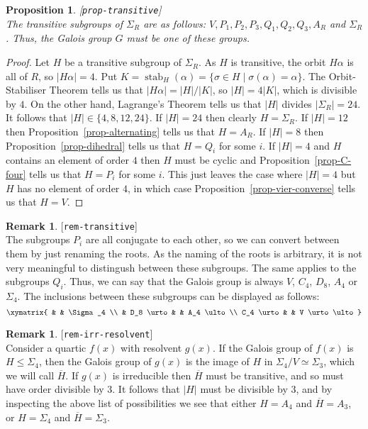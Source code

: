 \documentclass{amsart}
\newcommand{\lbl}[1]{\label{#1}\textup{[\texttt{#1}]}\ \\}
\newcommand{\lbl}{\label}
\newcommand{\stab}	{\operatorname{stab}}
\newcommand{\al}        {\alpha}
\newcommand{\sg}        {\sigma}
\newcommand{\Sg}        {\Sigma}
\newcommand{\ov}[1]     {\overline{#1}}
\newcommand{\st}        {\;|\;}
\renewcommand{\:}{\colon}
\newtheorem{proposition}[theorem]{Proposition}
\theoremstyle{definition}
\newtheorem{remark}[theorem]{Remark}
\begin{document}
\begin{proposition}\lbl{prop-transitive}
 The transitive subgroups of $\Sg_R$ are as follows:
 $V,P_1,P_2,P_3,Q_1,Q_2,Q_3,A_R$ and $\Sg_R$.  Thus, the Galois group
 $G$ must be one of these groups.
\end{proposition}
\begin{proof}
 Let $H$ be a transitive subgroup of $\Sg_R$.  
 As $H$ is transitive, the orbit $H\al$ is all of $R$, so $|H\al|=4$.
 Put $K=\stab_H(\al)=\{\sg\in H\st\sg(\al)=\al\}$.  The
 Orbit-Stabiliser Theorem tells us that $|H\al|=|H|/|K|$, so
 $|H|=4|K|$, which is divisible by $4$.  On the other hand, Lagrange's
 Theorem tells us that $|H|$ divides $|\Sg_R|=24$.  It follows that
 $|H|\in\{4,8,12,24\}$.  If $|H|=24$ then clearly $H=\Sg_R$.  If
 $|H|=12$ then Proposition~\ref{prop-alternating} tells us that
 $H=A_R$.  If $|H|=8$ then Proposition~\ref{prop-dihedral} tells us
 that $H=Q_i$ for some $i$.  If $|H|=4$ and $H$ contains an element of
 order $4$ then $H$ must be cyclic and Proposition~\ref{prop-C-four}
 tells us that $H=P_i$ for some $i$.  This just leaves the case where
 $|H|=4$ but $H$ has no element of order $4$, in which case
 Proposition~\ref{prop-vier-converse} tells us that $H=V$.
\end{proof}

\begin{remark}\lbl{rem-transitive}
 The subgroups $P_i$ are all conjugate to each other, so we can
 convert between them by just renaming the roots.  As the naming of
 the roots is arbitrary, it is not very meaningful to distingush
 between these subgroups.  The same applies to the subgroups $Q_i$.
 Thus, we can say that the Galois group is always $V$, $C_4$, $D_8$,
 $A_4$ or $\Sg_4$.  The inclusions between these subgroups can be
 displayed as follows:
 \[ \xymatrix{
     & & \Sg_4 \\
     & D_8 \urto & & A_4 \ulto \\
     C_4 \urto & & V \urto \ulto
    }
 \]
\end{remark}
\begin{remark}\lbl{rem-irr-resolvent}
 Consider a quartic $f(x)$ with resolvent $g(x)$.  If the Galois group
 of $f(x)$ is $H\leq\Sg_4$, then the Galois group of $g(x)$ is the
 image of $H$ in $\Sg_4/V\simeq\Sg_3$, which we will call $\ov{H}$.
 If $g(x)$ is irreducible then $\ov{H}$ must be transitive, and so
 must have order divisible by $3$.  It follows that $|H|$ must be
 divisible by $3$, and by inspecting the above list of possibilities
 we see that either $H=A_4$ and $\ov{H}=A_3$, or $H=\Sg_4$ and
 $\ov{H}=\Sg_3$.   
\end{remark}
\end{document}
